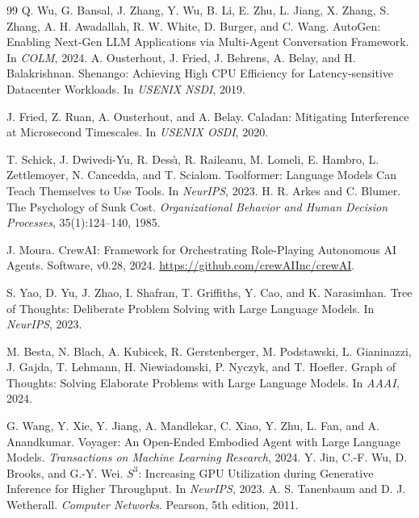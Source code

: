 \documentclass[sigconf,review,anonymous]{acmart}
\begin{document}
\begin{thebibliography}{99}
Q. Wu, G. Bansal, J. Zhang, Y. Wu, B. Li, E. Zhu, L. Jiang, X. Zhang, S. Zhang, A. H. Awadallah, R. W. White, D. Burger, and C. Wang.
\newblock AutoGen: Enabling Next-Gen LLM Applications via Multi-Agent Conversation Framework.
\newblock In \emph{COLM}, 2024.
A. Ousterhout, J. Fried, J. Behrens, A. Belay, and H. Balakrishnan.
\newblock Shenango: Achieving High CPU Efficiency for Latency-sensitive Datacenter Workloads.
\newblock In \emph{USENIX NSDI}, 2019.

J. Fried, Z. Ruan, A. Ousterhout, and A. Belay.
\newblock Caladan: Mitigating Interference at Microsecond Timescales.
\newblock In \emph{USENIX OSDI}, 2020.

T. Schick, J. Dwivedi-Yu, R. Dess\`{\i}, R. Raileanu, M. Lomeli, E. Hambro, L. Zettlemoyer, N. Cancedda, and T. Scialom.
\newblock Toolformer: Language Models Can Teach Themselves to Use Tools.
\newblock In \emph{NeurIPS}, 2023.
H. R. Arkes and C. Blumer.
\newblock The Psychology of Sunk Cost.
\newblock \emph{Organizational Behavior and Human Decision Processes}, 35(1):124--140, 1985.

J. Moura.
\newblock CrewAI: Framework for Orchestrating Role-Playing Autonomous AI Agents.
\newblock Software, v0.28, 2024.
\newblock \url{https://github.com/crewAIInc/crewAI}.

S. Yao, D. Yu, J. Zhao, I. Shafran, T. Griffiths, Y. Cao, and K. Narasimhan.
\newblock Tree of Thoughts: Deliberate Problem Solving with Large Language Models.
\newblock In \emph{NeurIPS}, 2023.

M. Besta, N. Blach, A. Kubicek, R. Gerstenberger, M. Podstawski, L. Gianinazzi, J. Gajda, T. Lehmann, H. Niewiadomski, P. Nyczyk, and T. Hoefler.
\newblock Graph of Thoughts: Solving Elaborate Problems with Large Language Models.
\newblock In \emph{AAAI}, 2024.

G. Wang, Y. Xie, Y. Jiang, A. Mandlekar, C. Xiao, Y. Zhu, L. Fan, and A. Anandkumar.
\newblock Voyager: An Open-Ended Embodied Agent with Large Language Models.
\newblock \emph{Transactions on Machine Learning Research}, 2024.
Y. Jin, C.-F. Wu, D. Brooks, and G.-Y. Wei.
\newblock $S^3$: Increasing GPU Utilization during Generative Inference for Higher Throughput.
\newblock In \emph{NeurIPS}, 2023.
A. S. Tanenbaum and D. J. Wetherall.
\newblock \emph{Computer Networks}.
\newblock Pearson, 5th edition, 2011.


\end{thebibliography}
\end{document}
